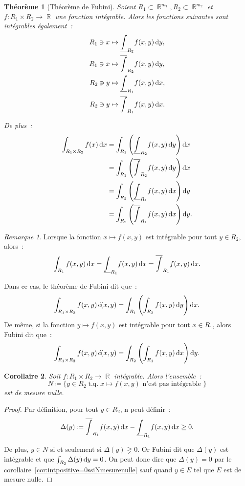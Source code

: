 \documentclass{article}
\DeclareMathOperator{\R}{\mathbb R}
\DeclareMathOperator{\tq}{ t.q. }
\newtheorem{thm}{Théorème}[section]
\newtheorem{cor}[thm]{Corollaire}
\theoremstyle{definition}
\theoremstyle{remark}
\newtheorem*{rmq}{Remarque}
\begin{document}
		\begin{thm}[Théorème de Fubini] Soient $R_1 \subset \R^{m_1}, R_2 \subset \R^{m_2}$ et $f : R_1 \times R_2 \to \R$ une fonction intégrable. Alors les
		fonctions suivantes sont intégrables également~:
		\begin{align*}
			R_1 \ni x &\mapsto \underline \int_{R_2} f(x, y)\dif y, \\
			R_1 \ni x &\mapsto \overline  \int_{R_2} f(x, y)\dif y, \\
			R_2 \ni y &\mapsto \underline \int_{R_1} f(x, y)\dif x, \\
			R_2 \ni y &\mapsto \overline  \int_{R_1} f(x, y)\dif x.
		\end{align*}

		De plus~:
		\begin{align*}
			\int_{R_1 \times R_2} f(x)\dif x
				&= \int_{R_1}\left(\underline \int_{R_2} f(x, y)\dif y\right)\dif x \\
				&= \int_{R_1}\left(\overline  \int_{R_2} f(x, y)\dif y\right)\dif x \\
				&= \int_{R_2}\left(\underline \int_{R_1} f(x, y)\dif x\right)\dif y \\
				&= \int_{R_2}\left(\overline  \int_{R_1} f(x, y)\dif x\right)\dif y.
		\end{align*}
		\end{thm}

		\begin{rmq} Lorsque la fonction $x \mapsto f(x, y)$ est intégrable pour tout $y \in R_2$, alors~:
		\[\int_{R_1} f(x, y)\dif x = \underline \int_{R_1} f(x, y)\dif x = \overline \int_{R_1} f(x, y)\dif x.\]

		Dans ce cas, le théorème de  Fubini dit que~:
		\[\int_{R_1 \times R_2} f(x, y)\dif (x, y) = \int_{R_1}\left(\int_{R_2} f(x, y)\dif y\right)\dif x.\]
		De même, si la fonction $y \mapsto f(x, y)$ est intégrable pour tout $x \in R_1$, alors Fubini dit que~:
		\[\int_{R_1 \times R_2} f(x, y)\dif (x, y) = \int_{R_2}\left(\int_{R_1} f(x, y)\dif x\right)\dif y.\]
		\end{rmq}

		\begin{cor} Soit $f : R_1 \times R_2 \to \R$ intégrable. Alors l'ensemble~:
		\[N \coloneqq \{y \in R_2 \tq x \mapsto f(x, y) \text{ n'est pas intégrable }\}\]
		est de mesure nulle.
		\end{cor}

		\begin{proof} Par définition, pour tout $y \in R_2$, n peut définir~:
		\[\Delta(y) \coloneqq \overline \int_{R_1} f(x, y)\dif x - \underline \int_{R_1} f(x, y)\dif x \geq 0.\]

		De plus, $y \in N$ si et seulement si $\Delta(y) \gneqq 0$. Or Fubini dit que $\Delta(y)$ est intégrable et que $\int_{R_2}\Delta(y)\dif y = 0$.
		On peut donc dire que $\Delta(y) = 0$ par le corollaire~\ref{cor:intpositive=0ssiNmesurenulle} sauf quand $y \in E$ tel que $E$ est de mesure nulle.
		\end{proof}
\end{document}
